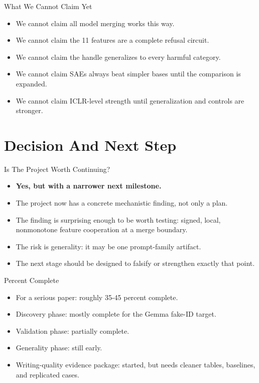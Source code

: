 \documentclass[aspectratio=169]{beamer}
\begin{document}
\begin{frame}{What We Cannot Claim Yet}
\small
\begin{itemize}
  \item We cannot claim all model merging works this way.
  \item We cannot claim the 11 features are a complete refusal circuit.
  \item We cannot claim the handle generalizes to every harmful category.
  \item We cannot claim SAEs always beat simpler bases until the comparison is expanded.
  \item We cannot claim ICLR-level strength until generalization and controls are stronger.
\end{itemize}
\end{frame}

\section{Decision And Next Step}

\begin{frame}{Is The Project Worth Continuing?}
\small
\begin{itemize}
  \item \textbf{Yes, but with a narrower next milestone.}
  \item The project now has a concrete mechanistic finding, not only a plan.
  \item The finding is surprising enough to be worth testing: signed, local, nonmonotone feature cooperation at a merge boundary.
  \item The risk is generality: it may be one prompt-family artifact.
  \item The next stage should be designed to falsify or strengthen exactly that point.
\end{itemize}
\end{frame}

\begin{frame}{Percent Complete}
\small
\begin{itemize}
  \item For a serious paper: roughly 35-45 percent complete.
  \item Discovery phase: mostly complete for the Gemma fake-ID target.
  \item Validation phase: partially complete.
  \item Generality phase: still early.
  \item Writing-quality evidence package: started, but needs cleaner tables, baselines, and replicated cases.
\end{itemize}
\end{frame}
\end{document}
